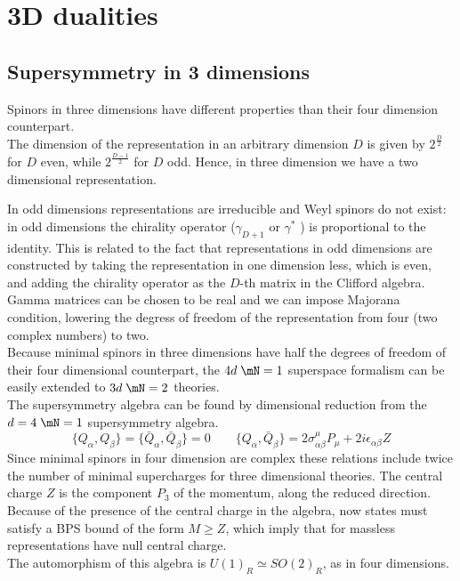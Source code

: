 

	\section{3D dualities}

\subsection{Supersymmetry in 3 dimensions}
Spinors in three dimensions have different properties than their four dimension counterpart.\\
The dimension of the representation in an arbitrary dimension $D$  is given by $2^{\frac{D}{2}} $
for $D$ even, while $2^{\frac{D-1}{2}} $ for $D$ odd.
Hence, in three dimension we have a two dimensional representation.

In odd dimensions representations are irreducible and Weyl spinors do not exist: in odd dimensions the chirality operator ($\gamma_{D+1}$ or $\gamma^*$ ) is proportional to the identity.
This is related to the fact that representations in odd dimensions are constructed by taking the representation in one dimension less, which is even, and adding the chirality operator as the $D$-th matrix in the Clifford algebra.\\
Gamma matrices can be chosen to be real and we can impose Majorana condition, lowering the degress of freedom of the representation from four (two complex numbers) to two.\\
Because minimal spinors in three dimensions have half the degrees of freedom of their four dimensional counterpart, the $4d \; \mN=1$ superspace formalism can be easily extended to $3d \; \mN=2$ theories.
\\
The supersymmetry algebra can be found by dimensional reduction from  the $d=4 \; \mN=1$ supersymmetry algebra. 
\begin{equation}
 \{ Q_{\alpha},Q_{\beta} \} =  \{ \bar{Q}_{\alpha},\bar{Q}_{\beta} \}= 0 \qquad \{ Q_{\alpha} , \bar{Q}_{\beta}   \} = 2 \sigma^{\mu}_{\alpha \beta} P_{\mu} + 2 i \epsilon_{\alpha \beta} Z
 \end{equation} 
Since minimal spinors in four dimension are complex these relations include twice the number of minimal supercharges for three dimensional theories.
The central charge $Z$ is the component $P_3$ of the momentum, along the reduced direction.
Because of the presence of the central charge in the algebra, now states must satisfy a BPS bound of the form $M \geq Z $, which imply that for massless representations have null central charge.
\\
The automorphism of this algebra is $U(1)_R \simeq SO(2)_R$, as in four dimensions.

